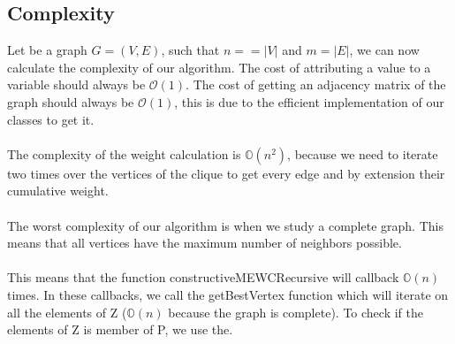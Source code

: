 
\subsection{Complexity}

    Let be a graph $G = (V,E)$, such that $n = =|V|$ and $m = |E|$, we can now calculate the complexity of our algorithm. The cost of attributing a value to a variable should always be $\mathcal{O}(1)$. The cost of getting an adjacency matrix of the graph should always be $\mathcal{O}(1)$, this is due to the efficient implementation of our classes to get it.
    \\ \\ 
    The complexity of the weight calculation is $\mathbb{O}(n^2)$, because we need to iterate two times over the vertices of the clique to get every edge and by extension their cumulative weight.
    \\ \\
    The worst complexity of our algorithm is when we study a complete graph. This means that all vertices have the maximum number of neighbors possible. 
    \\ \\
    This means that the function constructiveMEWCRecursive will callback $\mathbb{O}(n)$ times. In these callbacks, we call the getBestVertex function which will iterate on all the elements of Z ($\mathbb{O}(n)$ because the graph is complete). To check if the elements of Z is member of P, we use the.
